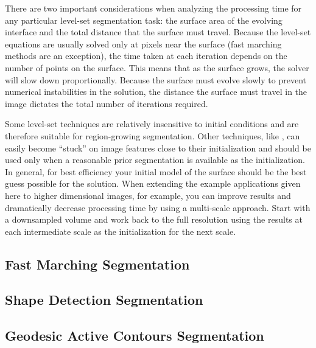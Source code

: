 There are two important considerations when analyzing the processing time for
any particular level-set segmentation task: the surface area of the evolving
interface and the total distance that the surface must travel.  Because the
level-set equations are usually solved only at pixels near the surface (fast
marching methods are an exception), the time taken at each iteration depends on
the number of points on the surface.  This means that as the surface grows, the
solver will slow down proportionally.  Because the surface must evolve slowly
to prevent numerical instabilities in the solution, the distance the surface
must travel in the image dictates the total number of iterations required.

Some level-set techniques are relatively insensitive to initial conditions and are
therefore suitable for region-growing segmentation. Other techniques, like
, can easily become
``stuck'' on image features close to their initialization and should be used
only when a reasonable prior segmentation is available as the initialization.
In general, for best efficiency your initial model of the surface should be the
best guess possible for the solution.  When extending the example applications
given here to higher dimensional images, for example, you can improve results
and dramatically decrease processing time by using a multi-scale
approach. Start with a downsampled volume and work back to the full resolution
using the results at each intermediate scale as the initialization for the next
scale.


\subsection{Fast Marching Segmentation}
\label{sec:FastMarchingImageFilter}

\ifitkFullVersion

\fi



\subsection{Shape Detection Segmentation}
\label{sec:ShapeDetectionLevelSetFilter}

\ifitkFullVersion

\fi


\subsection{Geodesic Active Contours Segmentation}
\label{sec:GeodesicActiveContourImageFilter}

